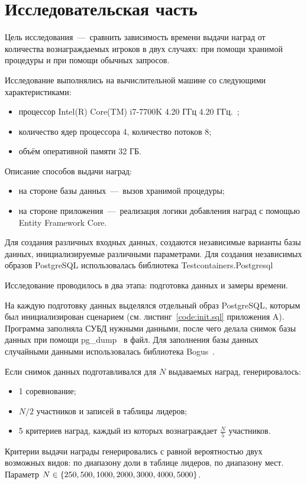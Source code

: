 \chapter{Исследовательская часть}
Цель исследования~---~сравнить зависимость времени выдачи наград от количества вознаграждаемых игроков в двух случаях: при помощи хранимой процедуры и при помощи обычных запросов.

Исследование выполнялись на вычислительной машине со следующими характеристиками:
\begin{itemize}
	\item процессор Intel(R) Core(TM) i7-7700K 4.20 ГГц 4.20 ГГц.~\cite{intel};
	\item количество ядер процессора 4, количество потоков 8;
	\item объём оперативной памяти 32 ГБ.
\end{itemize}

Описание способов выдачи наград:
\begin{itemize}
	\item на стороне базы данных~---~вызов хранимой процедуры;
	\item на стороне приложения~---~реализация логики добавления наград с помощью Entity Framework Core.
\end{itemize}

Для создания различных входных данных, создаются независимые варианты базы данных, инициализируемые различными параметрами. Для создания независимых образов PostgreSQL использовалась библиотека Testcontainers.Postgresql~\cite{testcontainers}

Исследование проводилось в два этапа: подготовка данных и замеры времени.

На каждую подготовку данных выделялся отдельный образ PostgreSQL, которым был инициализирован сценарием (см. листинг~\ref{code:init.sql} приложения A). Программа заполняла СУБД нужными данными, после чего делала снимок базы данных при помощи pg\_dump~\cite{postgresql_pgdump} в файл. Для заполнения базы данных случайными данными использовалась библиотека Bogus~\cite{bogus}.

Если снимок данных подготавливался для $N$ выдаваемых наград, генерировалось:
\begin{itemize}
	\item 1 соревнование;
	\item $N/2$ участников и записей в таблицы лидеров;
	\item 5 критериев наград, каждый из которых вознаграждает $\frac{N}{5}$ участников.
\end{itemize}
Критерии выдачи награды генерировались с равной вероятностью двух возможных видов: по диапазону доли в таблице лидеров, по диапазону мест. Параметр $N \in \{250, 500, 1000, 2000,\\ 3000, 4000, 5000\}$.

